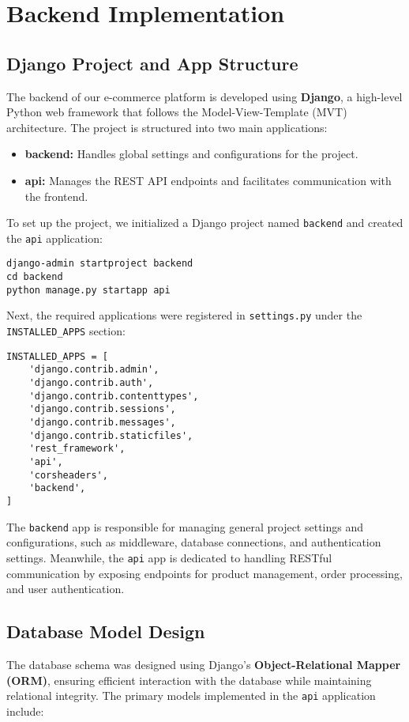 \section{Backend Implementation}

\subsection{Django Project and App Structure}
The backend of our e-commerce platform is developed using \textbf{Django}, a high-level Python web framework that follows the Model-View-Template (MVT) architecture. The project is structured into two main applications:  
\begin{itemize}
    \item \textbf{backend:} Handles global settings and configurations for the project.
    \item \textbf{api:} Manages the REST API endpoints and facilitates communication with the frontend.
\end{itemize}

To set up the project, we initialized a Django project named \texttt{backend} and created the \texttt{api} application:

\begin{verbatim}
django-admin startproject backend
cd backend
python manage.py startapp api
\end{verbatim}

Next, the required applications were registered in \texttt{settings.py} under the \texttt{INSTALLED\_APPS} section:

\begin{verbatim}
INSTALLED_APPS = [
    'django.contrib.admin',
    'django.contrib.auth',
    'django.contrib.contenttypes',
    'django.contrib.sessions',
    'django.contrib.messages',
    'django.contrib.staticfiles',
    'rest_framework',  
    'api',
    'corsheaders',
    'backend',
]
\end{verbatim}

The \texttt{backend} app is responsible for managing general project settings and configurations, such as middleware, database connections, and authentication settings. Meanwhile, the \texttt{api} app is dedicated to handling RESTful communication by exposing endpoints for product management, order processing, and user authentication.

\subsection{Database Model Design}
The database schema was designed using Django's \textbf{Object-Relational Mapper (ORM)}, ensuring efficient interaction with the database while maintaining relational integrity. The primary models implemented in the \texttt{api} application include:

